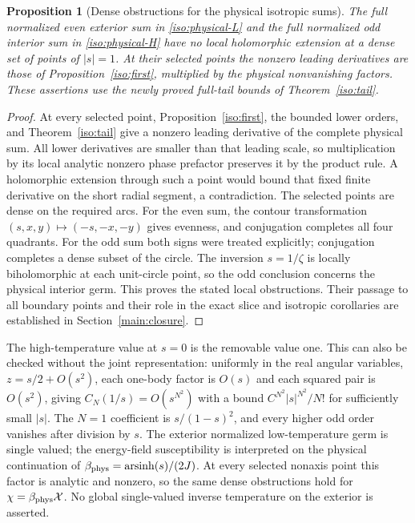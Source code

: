 \documentclass[11pt]{article}
\numberwithin{equation}{section}
\newtheorem{proposition}[theorem]{Proposition}
\theoremstyle{definition}
\begin{document}
\begin{proposition}[Dense obstructions for the physical isotropic sums]
\label{iso:local-obstruction}
The full normalized even exterior sum in \eqref{iso:physical-L}
and the full normalized odd interior sum in \eqref{iso:physical-H}
have no local holomorphic extension at a dense set of points of
\(|s|=1\). At their selected points the nonzero leading derivatives
are those of Proposition~\ref{iso:first}, multiplied by the physical
nonvanishing factors. These assertions use the newly proved full-tail
bounds of Theorem~\ref{iso:tail}.
\end{proposition}
\begin{proof}
At every selected point, Proposition~\ref{iso:first}, the bounded lower
orders, and Theorem~\ref{iso:tail} give a nonzero leading derivative of
the complete physical sum. All lower derivatives are smaller than that
leading scale, so multiplication by its local analytic nonzero phase
prefactor preserves it by the product rule. A holomorphic extension
through such a point would bound that fixed finite derivative on the
short radial segment, a contradiction. The selected points are dense on
the required arcs. For the even sum, the contour transformation
$(s,x,y)\mapsto(-s,-x,-y)$ gives evenness, and conjugation completes
all four quadrants. For the odd sum both signs were treated explicitly;
conjugation completes a dense subset of the circle. The inversion
\(s=1/\zeta\) is locally biholomorphic at each unit-circle point,
so the odd conclusion concerns the physical interior germ. This proves
the stated local obstructions. Their passage to all boundary points and
their role in the exact slice and isotropic corollaries are established
in Section~\ref{main:closure}.
\end{proof}

The high-temperature value at $s=0$ is the removable value one.
This can also be checked
without the joint representation: uniformly in the real angular
variables, $z=s/2+O(s^2)$, each one-body factor is $O(s)$ and each
squared pair is $O(s^2)$, giving $C_N(1/s)=O(s^{N^2})$ with a
bound $C^{N^2}|s|^{N^2}/N!$ for sufficiently small $|s|$.
The $N=1$ coefficient is $s/(1-s)^2$, and every higher odd order
vanishes after division by $s$. The exterior normalized
low-temperature germ is single valued; the energy-field susceptibility
is interpreted on the physical continuation of
$\beta_{\rm phys}=\operatorname{arsinh}(s)/(2J)$.
At every selected nonaxis point this factor is analytic and nonzero,
so the same dense obstructions hold for $\chi=\beta_{\rm phys}\mathcal X$.
No global single-valued inverse temperature on the exterior is asserted.
\end{document}
